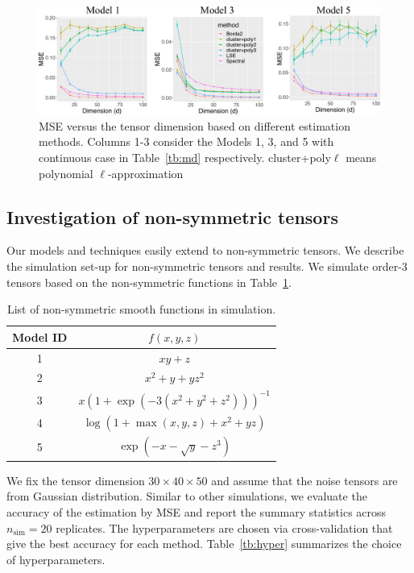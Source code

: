\documentclass[12pt]{article}
\theoremstyle{definition}
\begin{document}
\begin{figure}[h]
    \centering
    \includegraphics[width = \textwidth]{figure/newalg.pdf}   
    \caption{MSE versus the tensor dimension based on different estimation methods. Columns 1-3 consider the Models 1, 3, and 5 with continuous case in Table~\ref{tb:md} respectively. cluster+poly$\ell$ means polynomial $\ell$-approximation}
    \label{fig:method2}
\end{figure}



\subsection{Investigation of non-symmetric tensors}\label{subsec:asym}
Our models and techniques easily extend to non-symmetric tensors.
We describe the simulation set-up for non-symmetric tensors and results. We simulate order-3 tensors based on the non-symmetric functions in Table~\ref{tb:md2}. 

\begin{table}[ht]
    \centering
    \begin{tabular}{c|c}
        Model ID  &  $f(x,y,z)$  \\\hline
        1 &    $xy+z$ \\
        2&  $x^2+y +yz^2$\\
        3 & $x(1+\exp(-3(x^2+y^2+z^2)))^{-1}$\\
        4 & $\log(1+\max(x,y,z)+x^2+yz)$ \\
        5 &  $\exp\left(-x-\sqrt{y}-z^3\right)$
    \end{tabular}
    \caption{List of non-symmetric smooth functions in simulation.}
    \label{tb:md2}
\end{table}

 




We fix the tensor dimension ${30\times40\times 50}$ and assume that the noise tensors are from Gaussian distribution. Similar to other simulations, we evaluate the accuracy of the estimation by MSE and report the summary statistics across $n_{\text{sim}} = 20$ replicates. The hyperparameters are chosen via cross-validation that give the best accuracy for each method. Table~\ref{tb:hyper} summarizes the choice of hyperparameters.
\end{document}
